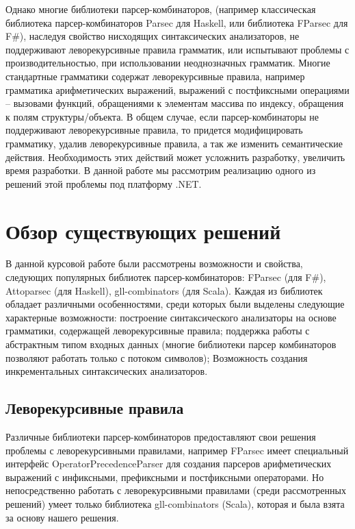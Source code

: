 \documentclass[14pt]{matmex-diploma}
\begin{document}
Однако многие библиотеки парсер-комбинаторов, 
  (например классическая библиотека парсер-комбинаторов Parsec \cite{LeijenMeijer:parsec} для Haskell, 
  или библиотека FParsec \cite{fparsec} для F\#), 
  наследуя свойство нисходящих синтаксических анализаторов, 
  не поддерживают леворекурсивные правила грамматик, 
  или испытывают проблемы с производительностью, 
  при использовании неоднозначных грамматик. 
  Многие стандартные грамматики содержат леворекурсивные правила, например грамматика арифметических выражений, 
  выражений с постфиксными операциями – вызовами функций,
  обращениями к элементам массива по индексу, 
обращения к полям структуры/объекта. В общем случае, если парсер-комбинаторы не поддерживают леворекурсивные правила, 
то придется модифицировать грамматику, удалив леворекурсивные правила, 
а так же изменить семантические действия. Необходимость этих действий может усложнить разработку, увеличить время разработки. В данной работе мы рассмотрим реализацию одного из решений этой проблемы под платформу .NET.


\section{Обзор существующих решений}

В данной курсовой работе были рассмотрены возможности и свойства, следующих популярных библиотек парсер-комбинаторов: 
FParsec (для F\#), Attoparsec \cite{attoparsec} (для Haskell), gll-combinators \cite{gllcombinators} (для Scala). Каждая из библиотек обладает различными особенностями, среди которых были выделены следующие характерные возможности: 
построение синтаксического анализаторы на основе грамматики, содержащей леворекурсивные правила; 
  поддержка работы с абстрактным типом входных данных 
  (многие библиотеки парсер комбинаторов позволяют работать только с потоком символов); 
  Возможность создания инкрементальных синтаксических анализаторов.

\subsection{Леворекурсивные правила}

Различные библиотеки парсер-комбинаторов предоставляют свои решения проблемы с леворекурсивными правилами, например FParsec имеет специальный интерфейс OperatorPrecedenceParser для создания парсеров арифметических выражений с инфиксными, префиксными и постфиксными операторами. Но непосредственно работать с леворекурсивными правилами (среди рассмотренных решений) умеет только библиотека gll-combinators (Scala), которая и была взята за основу нашего решения.
\end{document}
